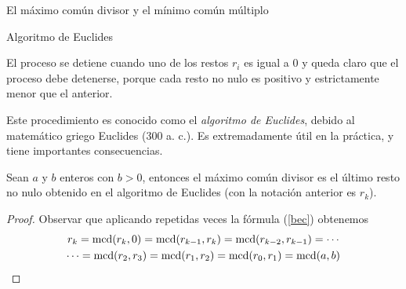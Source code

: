 \begin{section}{El máximo común divisor y el mínimo común múltiplo}
\begin{table}[htbp]
\centering
{}
\caption{Algoritmo de Euclides}
\label{tabla-AE}
\end{table}

El proceso se detiene cuando uno de los restos $r_i$  es igual a $0$ y queda claro que el proceso debe detenerse, porque cada resto no nulo es positivo y estrictamente menor que el anterior.

Este procedimiento es conocido como el \textit{algoritmo de Euclides}, debido al matemático griego Euclides ($300$ a. c.). Es extremadamente útil en la práctica, y tiene importantes consecuencias.


\begin{teorema} Sean  $a$ y $b$ enteros con $b >0$, entonces el máximo común divisor es el último resto no nulo obtenido en el algoritmo de Euclides (con la notación anterior es $r_k$). 
\end{teorema}
\begin{proof}
Observar que aplicando repetidas veces la fórmula (\ref{bec}) obtenemos 
\begin{multline*}
r_k = \operatorname{mcd}(r_{k},0) = \operatorname{mcd}(r_{k-1},r_k) =\operatorname{mcd}(r_{k-2},r_{k-1}) = \cdots\\\cdots 
=  \operatorname{mcd}(r_2,r_3) =  \operatorname{mcd}(r_1,r_2)  =  \operatorname{mcd}(r_0,r_1) = \operatorname{mcd}(a,b)  
\end{multline*}
\end{proof}






\end{section}
